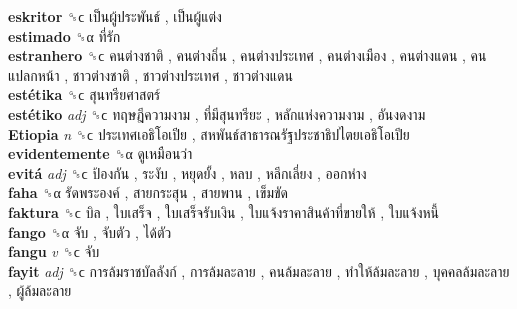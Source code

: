 \textbf{eskritor} ␝ϲ   เป็นผู้ประพันธ์ ,  เป็นผู้แต่ง   \\
\textbf{estimado} ␝α   ที่รัก   \\
\textbf{estranhero} ␝ϲ   คนต่างชาติ ,  คนต่างถิ่น ,  คนต่างประเทศ ,  คนต่างเมือง ,  คนต่างแดน ,  คนแปลกหน้า ,  ชาวต่างชาติ ,  ชาวต่างประเทศ ,  ชาวต่างแดน   \\
\textbf{estétika} ␝ϲ   สุนทรียศาสตร์   \\
\textbf{estétiko} \emph{adj}  ␝ϲ   ทฤษฎีความงาม ,  ที่มีสุนทรียะ ,  หลักแห่งความงาม ,  อันงดงาม   \\
\textbf{Etiopia} \emph{n}  ␝ϲ   ประเทศเอธิโอเปีย ,  สหพันธ์สาธารณรัฐประชาธิปไตยเอธิโอเปีย   \\
\textbf{evidentemente} ␝α   ดูเหมือนว่า   \\
\textbf{evitá} \emph{adj}  ␝ϲ   ป้องกัน ,  ระงับ ,  หยุดยั้ง ,  หลบ ,  หลีกเลี่ยง ,  ออกห่าง   \\
\textbf{faha} ␝α   รัดพระองค์ ,  สายกระสุน ,  สายพาน ,  เข็มขัด   \\
\textbf{faktura} ␝ϲ   บิล ,  ใบเสร็จ ,  ใบเสร็จรับเงิน ,  ใบแจ้งราคาสินค้าที่ขายให้ ,  ใบแจ้งหนี้   \\
\textbf{fango} ␝α   จับ ,  จับตัว ,  ได้ตัว   \\
\textbf{fangu} \emph{v}  ␝ϲ   จับ   \\
\textbf{fayit} \emph{adj}  ␝ϲ   การล้มราชบัลลังก์ ,  การล้มละลาย ,  คนล้มละลาย ,  ทำให้ล้มละลาย ,  บุคคลล้มละลาย ,  ผู้ล้มละลาย   \\
